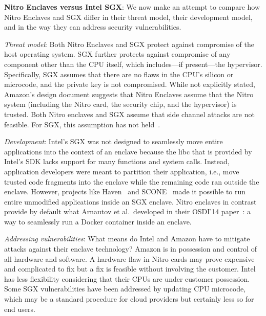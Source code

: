 \textbf{Nitro Enclaves versus Intel SGX}:
We now make an attempt to compare how Nitro Enclaves and SGX differ in their
threat model, their development model, and in the way they can address security
vulnerabilities.

\emph{Threat model}:
Both Nitro Enclaves and SGX protect against compromise of the host operating
system.  SGX further protects against compromise of any component other than the
CPU itself, which includes---if present---the hypervisor.  Specifically, SGX
assumes that there are no flaws in the CPU's silicon or microcode, and the
private key is not compromised.  While not explicitly stated, Amazon's design
document suggests that Nitro Enclaves assume that the Nitro system (including
the Nitro card, the security chip, and the hypervisor) is trusted.  Both Nitro
enclaves and SGX assume that side channel attacks are not feasible.  For SGX,
this assumption has not held~\cite{Nilsson20a,Fei2021a}.

\emph{Development}:
Intel's SGX was not designed to seamlessly move entire applications into the
context of an enclave because the libc that is provided by Intel's SDK lacks
support for many functions and system calls.  Instead, application developers
were meant to partition their application, i.e., move trusted code fragments
into the enclave while the remaining code ran outside the enclave.  However,
projects like Haven~\cite{Baumann2014a} and SCONE~\cite{Arnautov2016a} made it
possible to run entire unmodified applications inside an SGX enclave.  Nitro
enclaves in contrast provide by default what Arnautov et al.\ developed in their
OSDI'14 paper~\cite{Arnautov2016a}: a way to seamlessly run a Docker container
inside an enclave.

\emph{Addressing vulnerabilities}:
What means do Intel and Amazon have to mitigate attacks against their enclave
technology?  Amazon is in possession and control of all hardware and software.
A hardware flaw in Nitro cards may prove expensive and complicated to fix but a
fix is feasible without involving the customer.  Intel has less flexibility
considering that their CPUs are under customer possession.  Some SGX
vulnerabilities have been addressed by updating CPU microcode, which may be a
standard procedure for cloud providers but certainly less so for end users.

